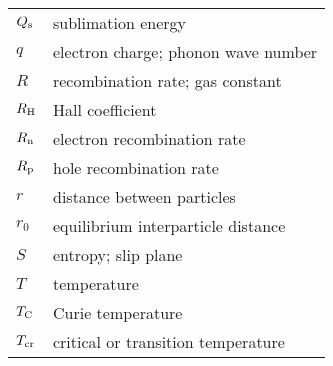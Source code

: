 \begin{table}[h]
\begin{center}
{\begin{tabular}{p{1.0cm} p{10.5cm}}
		$Q_{\text{s}}$ & sublimation energy\\
		$q$ & electron charge; phonon wave number\\
		$R$ & recombination rate; gas constant\\
		$R_{\text{H}}$ &  Hall coefficient\\
		$R_{\text{n}}$ & electron recombination rate\\
		$R_{\text{p}}$ & hole recombination rate\\
		$r$ & distance between particles\\
		$r_0$ & equilibrium interparticle distance\\
		$S$ & entropy; slip plane\\
		$T$ & temperature\\
		$T_{\text{C}}$ & Curie temperature\\
		$T_{\text{cr}}$ & critical or transition temperature\\
    \end{tabular}
	}\end{center}
\end{table}

